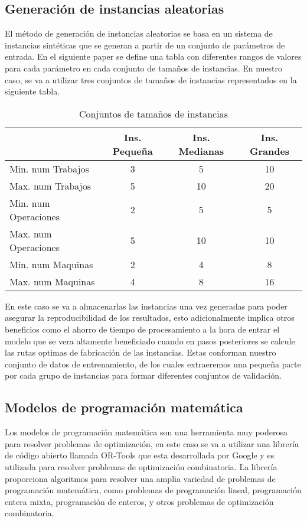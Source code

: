 \subsection{Generación de instancias aleatorias}
El método de generación de instancias aleatorias se basa en un sistema de instancias sintéticas
que se generan a partir de un conjunto de parámetros de entrada. En el siguiente paper \cite{pbrandimarte}
se define una tabla con diferentes rangos de valores para cada parámetro en cada conjunto de
tamaños de instancias. En nuestro caso, se va a utilizar tres conjuntos de tamaños de instancias
representados en la siguiente tabla.

\begin{table}[ht]
    \centering
    \begin{tabular}[t]{|l|ccc|}
        \hline
                  & Ins. Pequeña & Ins. Medianas & Ins. Grandes \\
        \hline
        Min. num Trabajos    & 3    & 5     & 10    \\
        Max. num Trabajos    & 5    & 10    & 20    \\
        Min. num Operaciones & 2    & 5     & 5     \\
        Max. num Operaciones & 5    & 10    & 10    \\
        Min. num Maquinas    & 2    & 4     & 8     \\
        Max. num Maquinas    & 4    & 8     & 16    \\
        \hline
    \end{tabular}
    \caption{Conjuntos de tamaños de instancias}
\end{table}

En este caso se va a almacenarlas las instancias una vez generadas para poder asegurar la reproducibilidad 
de los resultados, esto adicionalmente implica otros beneficios como el ahorro de tiempo de procesamiento
a la hora de entrar el modelo que se vera altamente beneficiado cuando en pasos posteriores se calcule
las rutas optimas de fabricación de las instancias. Estas conforman nuestro conjunto de datos de 
entrenamiento, de los cuales extraeremos una pequeña parte por cada grupo de instancias para formar
diferentes conjuntos de validación. 

\subsection{Modelos de programación matemática}
Los modelos de programación matemática son una herramienta muy poderosa para resolver problemas
de optimización, en este caso se va a utilizar una librería de código abierto llamada OR-Tools 
\cite{ortools} que esta desarrollada por Google y es utilizada para resolver problemas de optimización 
combinatoria. La librería proporciona algoritmos para resolver una amplia variedad de problemas 
de programación matemática, como problemas de programación lineal, programación entera mixta, 
programación de enteros, y otros problemas de optimización combinatoria.\medskip 

